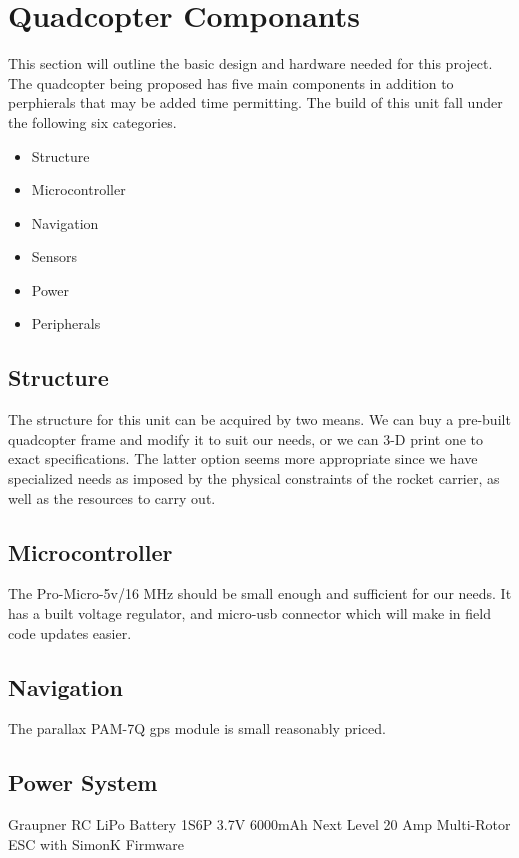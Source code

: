 \documentclass[10pt,a4paper]{article}
\begin{document}
\section{Quadcopter Componants}
This section will outline the basic design and hardware needed for this project. The quadcopter being proposed has five main components in addition to perphierals that may be added time permitting. The build of this unit fall under the following six categories.
\begin{itemize}
	\item Structure
	\item Microcontroller
	\item Navigation
	\item Sensors
	\item Power
	\item Peripherals
\end{itemize}

\subsection{Structure}

The structure for this unit can be acquired by two means. We can buy a pre-built quadcopter frame and modify it to suit our needs, or we can 3-D print one to exact specifications. The latter option seems more appropriate since we have specialized needs as imposed by the physical constraints of the rocket carrier, as well as the resources to carry out.  

\subsection{Microcontroller}
The Pro-Micro-5v/16 MHz should be small enough and sufficient for our needs. It has a built voltage regulator, and micro-usb connector which will make in field code updates easier. 

\subsection{Navigation}

The parallax PAM-7Q gps module is small reasonably priced.


\subsection{Power System}
Graupner RC LiPo Battery 1S6P 3.7V 6000mAh
Next Level 20 Amp Multi-Rotor ESC with SimonK Firmware 
\end{document}
